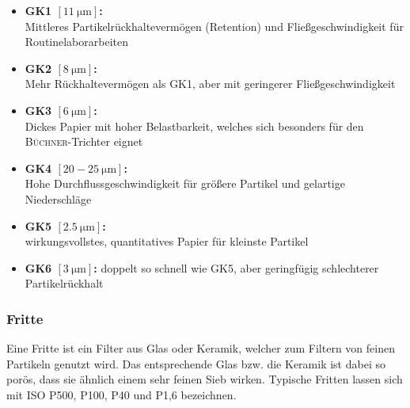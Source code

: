 	\begin{itemize}
		\item \textbf{GK1 $\left[\SI{11}{\micro \meter}\right]$:} \\
		Mittleres Partikelrückhaltevermögen (Retention) und Fließgeschwindigkeit für Routinelaborarbeiten		
		\item \textbf{GK2 $\left[\SI{8}{\micro \meter}\right]$:}\\
		Mehr Rückhaltevermögen als GK1, aber mit geringerer Fließgeschwindigkeit
		\item \textbf{GK3 $\left[\SI{6}{\micro \meter}\right]$:}\\
		Dickes Papier mit hoher Belastbarkeit, welches sich besonders für den \textsc{Büchner}-Trichter eignet
		\item \textbf{GK4 $\left[\text{20}-\SI{25}{\micro \meter}\right]$:}\\
		Hohe Durchflussgeschwindigkeit für größere Partikel und gelartige Niederschläge
		\item \textbf{GK5 $\left[\SI{2,5}{\micro \meter}\right]$:}\\ wirkungsvollstes, quantitatives Papier für kleinste Partikel
		\item \textbf{GK6 $\left[\SI{3}{\micro \meter}\right]$:} doppelt so schnell wie GK5, aber geringfügig schlechterer Partikelrückhalt
\end{itemize}


\subsubsection*{Fritte}
Eine Fritte ist ein Filter aus Glas oder Keramik, welcher zum Filtern von feinen Partikeln genutzt wird. Das entsprechende Glas bzw. die Keramik ist dabei so porös, dass sie ähnlich einem sehr feinen Sieb wirken. Typische Fritten lassen sich mit ISO P500, P100, P40 und P1,6 bezeichnen.

